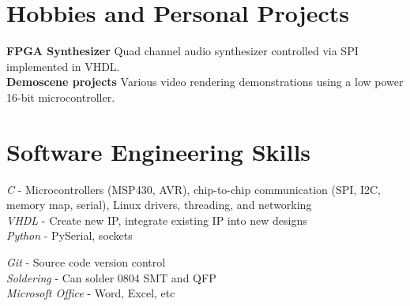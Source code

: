 \documentclass[10pt]{article} %
\begin{document}

\section {Hobbies and Personal Projects}

\textbf{FPGA Synthesizer} Quad channel audio synthesizer controlled via SPI implemented in VHDL.\\
\smallskip
\textbf{Demoscene projects} Various video rendering demonstrations using a low power 16-bit microcontroller.




\section{Software Engineering Skills}

{
  \textit{C} - Microcontrollers (MSP430, AVR), chip-to-chip communication (SPI, I2C, memory map, serial), Linux drivers, threading, and networking\\
\textit{VHDL} - Create new IP, integrate existing IP into new designs\\
\textit{Python} - PySerial, sockets
}


{
\textit{Git} - Source code version control\\
\textit{Soldering} - Can solder 0804 SMT and QFP\\
\textit{Microsoft Office} - Word, Excel, etc
}
\end{document}
